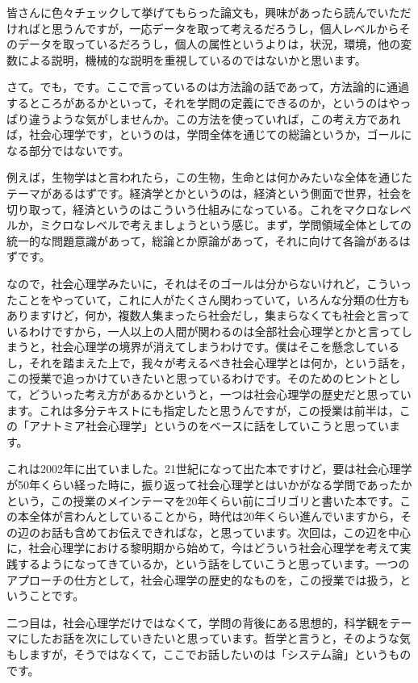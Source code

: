 \documentclass{ltjsbook}
\begin{document}
皆さんに色々チェックして挙げてもらった論文も，興味があったら読んでいただければと思うんですが，一応データを取って考えるだろうし，個人レベルからそのデータを取っているだろうし，個人の属性というよりは，状況，環境，他の変数による説明，機械的な説明を重視しているのではないかと思います。

さて。でも，です。ここで言っているのは方法論の話であって，方法論的に通過するところがあるかといって，それを学問の定義にできるのか，というのはやっぱり違うような気がしませんか。この方法を使っていれば，この考え方であれば，社会心理学です，というのは，学問全体を通じての総論というか，ゴールになる部分ではないです。

例えば，生物学はと言われたら，この生物，生命とは何かみたいな全体を通じたテーマがあるはずです。経済学とかというのは，経済という側面で世界，社会を切り取って，経済というのはこういう仕組みになっている。これをマクロなレベルか，ミクロなレベルで考えましょうという感じ。まず，学問領域全体としての統一的な問題意識があって，総論とか原論があって，それに向けて各論があるはずです。

なので，社会心理学みたいに，それはそのゴールは分からないけれど，こういったことをやっていて，これに人がたくさん関わっていて，いろんな分類の仕方もありますけど，何か，複数人集まったら社会だし，集まらなくても社会と言っているわけですから，一人以上の人間が関わるのは全部社会心理学とかと言ってしまうと，社会心理学の境界が消えてしまうわけです。僕はそこを懸念しているし，それを踏まえた上で，我々が考えるべき社会心理学とは何か，という話を，この授業で追っかけていきたいと思っているわけです。そのためのヒントとして，どういった考え方があるかというと，一つは社会心理学の歴史だと思っています。これは多分テキストにも指定したと思うんですが，この授業は前半は，この「アナトミア社会心理学」というのをベースに話をしていこうと思っています\parencite{anatomia}。

これは2002年に出ていました。21世紀になって出た本ですけど，要は社会心理学が50年くらい経った時に，振り返って社会心理学とはいかがなる学問であったかという，この授業のメインテーマを20年くらい前にゴリゴリと書いた本です。この本全体が言わんとしていることから，時代は20年くらい進んでいますから，その辺のお話も含めてお伝えできればな，と思っています。次回は，この辺を中心に，社会心理学における黎明期から始めて，今はどういう社会心理学を考えて実践するようになってきているか，という話をしていこうと思っています。一つのアプローチの仕方として，社会心理学の歴史的なものを，この授業では扱う，ということです。

二つ目は，社会心理学だけではなくて，学問の背後にある思想的，科学観をテーマにしたお話を次にしていきたいと思っています。哲学と言うと，そのような気もしますが，そうではなくて，ここでお話したいのは「システム論」というものです。
\end{document}
